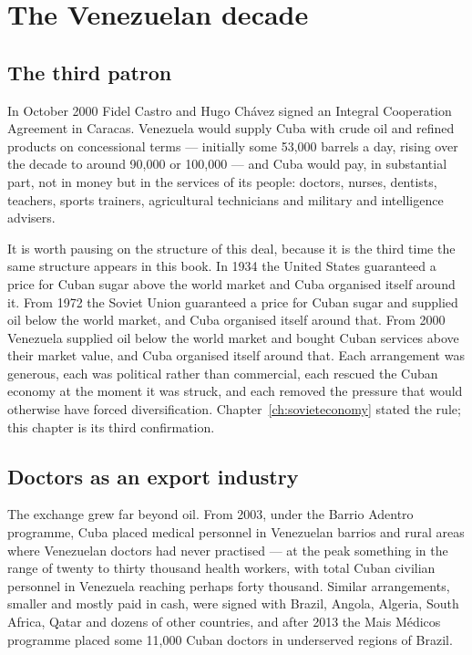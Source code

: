 \chapter{The Venezuelan decade}
\label{ch:venezuela}

\section{The third patron}

In October 2000 Fidel Castro and Hugo Ch\'avez signed an Integral Cooperation
Agreement in Caracas. Venezuela would supply Cuba with crude oil and refined
products on concessional terms --- initially some 53,000 barrels a day, rising
over the decade to around 90,000 or 100,000 --- and Cuba would pay, in
substantial part, not in money but in the services of its people: doctors,
nurses, dentists, teachers, sports trainers, agricultural technicians and
military and intelligence advisers.\unv{}

It is worth pausing on the structure of this deal, because it is the third time
the same structure appears in this book. In 1934 the United States guaranteed a
price for Cuban sugar above the world market and Cuba organised itself around
it. From 1972 the Soviet Union guaranteed a price for Cuban sugar and supplied
oil below the world market, and Cuba organised itself around that. From 2000
Venezuela supplied oil below the world market and bought Cuban services above
their market value, and Cuba organised itself around that. Each arrangement was
generous, each was political rather than commercial, each rescued the Cuban
economy at the moment it was struck, and each removed the pressure that would
otherwise have forced diversification. Chapter~\ref{ch:sovieteconomy} stated the
rule; this chapter is its third confirmation.

\section{Doctors as an export industry}

The exchange grew far beyond oil. From 2003, under the Barrio Adentro
programme, Cuba placed medical personnel in Venezuelan barrios and rural areas
where Venezuelan doctors had never practised --- at the peak something in the
range of twenty to thirty thousand health workers, with total Cuban civilian
personnel in Venezuela reaching perhaps forty thousand.\unv{} Similar
arrangements, smaller and mostly paid in cash, were signed with Brazil,
Angola, Algeria, South Africa, Qatar and dozens of other countries, and after
2013 the Mais M\'edicos programme placed some 11,000 Cuban doctors in
underserved regions of Brazil.

